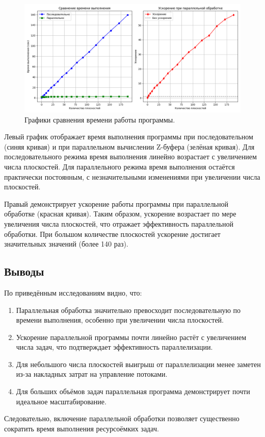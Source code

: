 \begin{figure}[H]
    \centering
    \includegraphics[width=1\textwidth]{img/test_calc_pixel_matrix_performance.png}
    \caption{Графики сравнения времени работы программы.}
    \label{fig:performance_results}
\end{figure}

Левый график отображает время выполнения программы при последовательном (синяя кривая) и при параллельном вычислении Z-буфера (зелёная кривая). Для последовательного режима время выполнения линейно возрастает с увеличением числа плоскостей. Для параллельного режима время выполнения остаётся практически постоянным, с незначительными изменениями при увеличении числа плоскостей.

Правый демонстрирует ускорение работы программы при параллельной обработке (красная кривая). Таким образом, ускорение возрастает по мере увеличения числа плоскостей, что отражает эффективность параллельной обработки. При большом количестве плоскостей ускорение достигает значительных значений (более 140 раз).


\subsection{Выводы}

\hspace{1.25cm}
По приведённым исследованиям видно, что:

\begin{enumerate}
\item Параллельная обработка значительно превосходит последовательную по времени выполнения, особенно при увеличении числа плоскостей.

\item Ускорение параллельной программы почти линейно растёт с увеличением числа задач, что подтверждает эффективность параллелизации.

\item Для небольшого числа плоскостей выигрыш от параллелизации менее заметен из-за накладных затрат на управление потоками.

\item Для больших объёмов задач параллельная программа демонстрирует почти идеальное масштабирование.
\end{enumerate}

Следовательно, включение параллельной обработки позволяет существенно сократить время выполнения ресурсоёмких задач.

\newpage